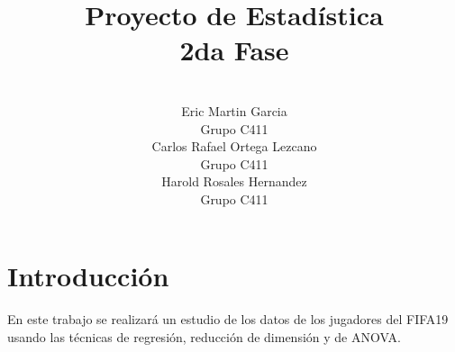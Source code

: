 \documentclass[a4paper,10pt,twocolumn]{article}
\title{Proyecto de Estad\'istica \\ 2da Fase}
\author{\\
	\name Eric Martin Garcia \\ \addr Grupo C411 \\
	\name Carlos Rafael Ortega Lezcano \\ \addr Grupo C411 \\
	\name Harold Rosales Hernandez \\ \addr Grupo C411 }
\begin{document}



\section*{Introducción}\label{sec:intro}
En este trabajo se realizará un estudio de los datos de los jugadores del FIFA19 usando las técnicas de regresión, reducción de dimensión y de ANOVA.
\end{document}
